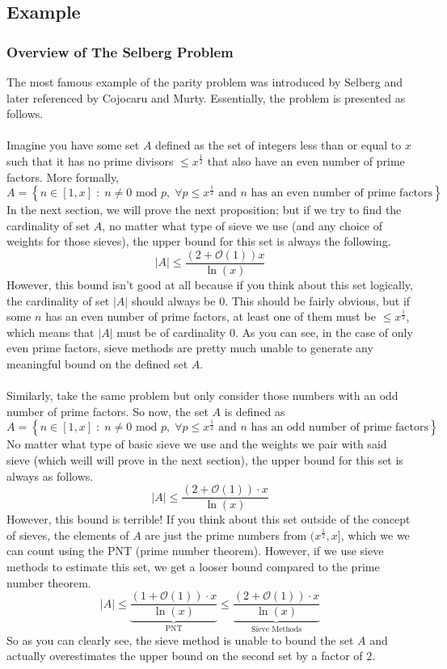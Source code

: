 \documentclass[10pt]{extarticle}
\begin{document}
\subsection{Example}
\subsubsection{Overview of The Selberg Problem}
The most famous example of the parity problem was introduced by Selberg and later referenced by Cojocaru and Murty. Essentially, the problem is presented as follows.\\
\\
Imagine you have some set $A$ defined as the set of integers less than or equal to $x$ such that it has no prime divisors $\leq x^\frac{1}{2}$ that also have an even number of prime factors. More formally,
$$
A = \left\{n \in [1,x] \;:\; n \neq 0 \text{ mod }p, \;\forall p\leq x^{\frac{1}{2}} \text{ and } n \text{ has an even number of prime factors}\right\}
$$
In the next section, we will prove the next proposition; but if we try to find the cardinality of set $A$, no matter what type of sieve we use (and any choice of weights for those sieves), the upper bound for this set is always the following.
$$
|A| \leq \frac{(2 + \mathcal{O}(1))x}{\ln(x)}
$$
However, this bound isn't good at all because if you think about this set logically, the cardinality of set $|A|$ should always be $0$. This should be fairly obvious, but if some $n$ has an even number of prime factors, at least one of them must be $\leq x^{\frac{1}{2}}$, which means that $|A|$ must be of cardinality $0$. As you can see, in the case of only even prime factors, sieve methods are pretty much unable to generate any meaningful bound on the defined set $A$. \\
\\
Similarly, take the same problem but only consider those numbers with an odd number of prime factors. So now, the set $A$ is defined as
$$
A = \left\{n \in [1,x] \;:\; n \neq 0 \text{ mod }p, \;\forall p\leq x^{\frac{1}{2}} \text{ and } n \text{ has an odd number of prime factors}\right\}
$$
No matter what type of basic sieve we use and the weights we pair with said sieve (which weill will prove in the next section), the upper bound for this set is always as follows.
$$
|A| \leq \frac{(2 + \mathcal{O}(1)) \cdot x}{\ln(x)}
$$
However, this bound is terrible! If you think about this set outside of the concept of sieves, the elements of $A$ are just the prime numbers from $(x^{\frac{1}{2}}, x]$, which we we can count using the PNT (prime number theorem). However, if we use sieve methods to estimate this set, we get a looser bound compared to the prime number theorem.
$$
|A| \leq \underbrace{\frac{\left(1 + \mathcal{O}(1)\right) \cdot x}{\ln (x)}}_{\text{PNT}} \leq \underbrace{\frac{(2 + \mathcal{O}(1)) \cdot x}{\ln(x)}}_{\text{Sieve Methods}}
$$
So as you can clearly see, the sieve method is unable to bound the set $A$ and actually overestimates the upper bound on the second set by a factor of $2$.
\end{document}
